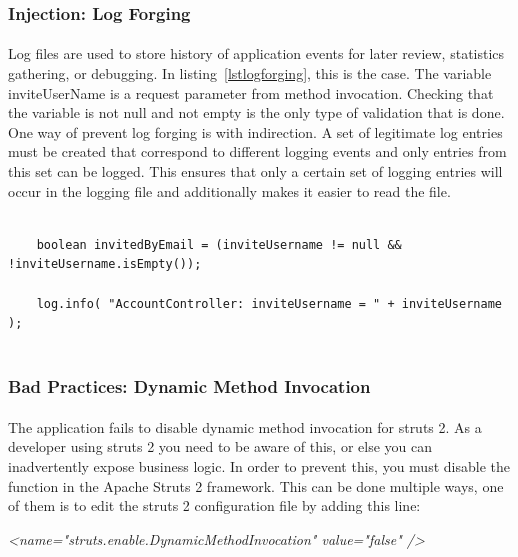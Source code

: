 \documentclass[11pt,english,a4paper]{report}
\begin{document}
\subsubsection{Injection: Log Forging}
\paragraph{}
Log files are used to store history of application events for later review, statistics gathering, or debugging.
In listing~\ref{lstlogforging}, this is the case.
The variable inviteUserName is a request parameter from method invocation. 
Checking that the variable is not null and not empty is the only type of validation that is done. 
One way of prevent log forging is with indirection.
A set of legitimate log entries must be created that correspond to different logging events and only entries from this set can be logged.
This ensures that only a certain set of logging entries will occur in the logging file and additionally makes it easier to read the file.

\begin{lstlisting}[caption=Log forging in the AccountController class, label=lstlogforging]
	
	boolean invitedByEmail = (inviteUsername != null && !inviteUsername.isEmpty());

	log.info( "AccountController: inviteUsername = " + inviteUsername );


\end{lstlisting}

\subsubsection{Bad Practices: Dynamic Method Invocation}
\paragraph{}
The application fails to disable dynamic method invocation for struts 2.
As a developer using struts 2 you need to be aware of this, or else you can inadvertently expose business logic.
In order to prevent this, you must disable the function in the Apache Struts 2 framework.
This can be done multiple ways, one of them is to edit the struts 2 configuration file by adding this line:
\begin{center}
	\textit{\textless name="struts.enable.DynamicMethodInvocation" value="false" /\textgreater }

\end{center}
\end{document}
